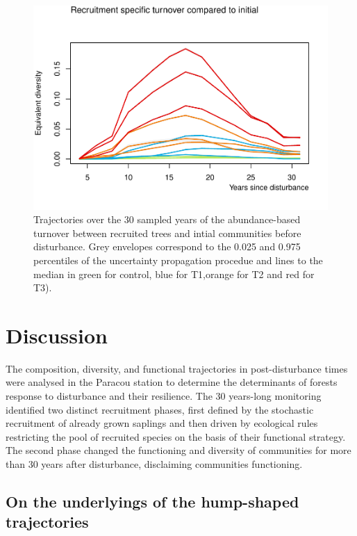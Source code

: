 \documentclass[fleqn,10pt]{ArtEcoFoG} %
\begin{document}
\begin{figure}

{\centering \includegraphics{RecruitmentTrajectories_files/figure-latex/Turnover-1} 

}

\caption{Trajectories over the 30 sampled years of the abundance-based turnover between recruited trees and intial communities before disturbance. Grey envelopes correspond to the 0.025 and 0.975 percentiles of the uncertainty propagation procedue and lines to the median in green for control, blue for T1,orange for T2 and red for T3).}\label{fig:Turnover}
\end{figure}

\section{Discussion}\label{discussion}

The composition, diversity, and functional trajectories in
post-disturbance times were analysed in the Paracou station to determine
the determinants of forests response to disturbance and their
resilience. The 30 years-long monitoring identified two distinct
recruitment phases, first defined by the stochastic recruitment of
already grown saplings and then driven by ecological rules restricting
the pool of recruited species on the basis of their functional strategy.
The second phase changed the functioning and diversity of communities
for more than 30 years after disturbance, disclaiming communities
functioning.

\subsection{On the underlyings of the hump-shaped
trajectories}\label{on-the-underlyings-of-the-hump-shaped-trajectories}
\end{document}
